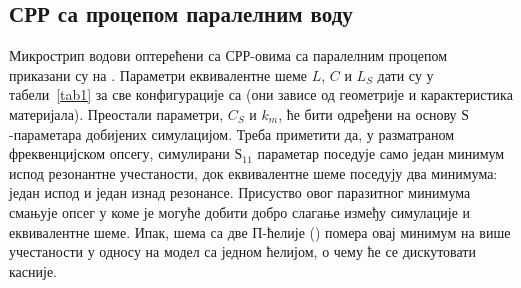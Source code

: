 \documentclass[main.tex]{subfiles}
\begin{document}
\subsection{СРР са процепом паралелним воду}\label{sec3:2}
Микрострип водови оптерећени са СРР-овима са паралелним процепом приказани су на .
Параметри еквивалентне шеме $L$, $C$ и $L_S$ дати су у табели~\ref{tab1} за све конфигурације са  (они зависе од геометрије и карактеристика материјала). Преостали параметри, $C_S$ и $k_m$, ће бити одређени на основу $Ѕ$-параметара добијених симулацијом. Треба приметити да, у разматраном фреквенцијском опсегу, симулирани $Ѕ_{11}$ параметар поседује само један минимум испод резонантне учестаности, док еквивалентне шеме поседују два минимума: један испод и један изнад резонансе. Присуство овог паразитног минимума смањује опсег у коме је могуће добити добро слагање између симулације и еквивалентне шеме. Ипак, шема са две П-ћелије () помера овај минимум на више учестаности у односу на модел са једном ћелијом, о чему ће се дискутовати касније.
\end{document}
